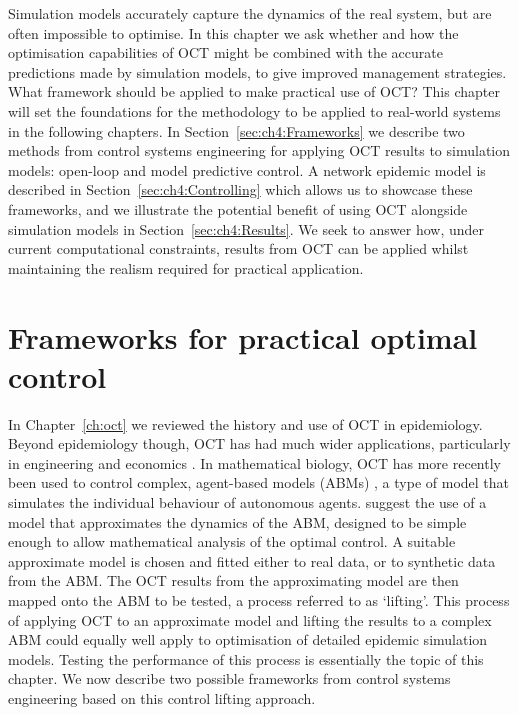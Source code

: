 Simulation models accurately capture the dynamics of the real system, but are often impossible to optimise. In this chapter we ask whether and how the optimisation capabilities of OCT might be combined with the accurate predictions made by simulation models, to give improved management strategies. What framework should be applied to make practical use of OCT? This chapter will set the foundations for the methodology to be applied to real-world systems in the following chapters. In Section~\ref{sec:ch4:Frameworks} we describe two methods from control systems engineering for applying OCT results to simulation models: open-loop and model predictive control. A network epidemic model is described in Section~\ref{sec:ch4:Controlling} which allows us to showcase these frameworks, and we illustrate the potential benefit of using OCT alongside simulation models in Section~\ref{sec:ch4:Results}. We seek to answer how, under current computational constraints, results from OCT can be applied whilst maintaining the realism required for practical application.

\section{Frameworks for practical optimal control\label{sec:ch4:Frameworks}}

In Chapter~\ref{ch:oct} we reviewed the history and use of OCT in epidemiology. Beyond epidemiology though, OCT has had much wider applications, particularly in engineering and economics \citep{bertsekas_dynamic_2001}. In mathematical biology, OCT has more recently been used to control complex, agent-based models (ABMs) \citep{an_optimization_2017}, a type of model that simulates the individual behaviour of autonomous agents. \citet{an_optimization_2017} suggest the use of a model that approximates the dynamics of the ABM, designed to be simple enough to allow mathematical analysis of the optimal control. A suitable approximate model is chosen and fitted either to real data, or to synthetic data from the ABM\@. The OCT results from the approximating model are then mapped onto the ABM to be tested, a process referred to as `lifting'. This process of applying OCT to an approximate model and lifting the results to a complex ABM could equally well apply to optimisation of detailed epidemic simulation models. Testing the performance of this process is essentially the topic of this chapter. We now describe two possible frameworks from control systems engineering based on this control lifting approach.

